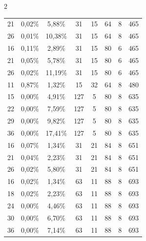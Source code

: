 \begin{multicols}{2}
\begin{center}
{\begin{tabular}{|c|c|c|c|c|c|c|c|}
21&0,02\%&\hphantom{9}5,88\%&31&15&64&8&465\\

26&0,01\%&10,38\%&31&15&64&8&465\\

\hline

16&0,11\%&\hphantom{9}2,89\%&31&15&80&6&465\\

21&0,05\%&\hphantom{9}5,78\%&31&15&80&6&465\\

26&0,02\%&11,19\%&31&15&80&6&465\\

\hline

11&0,87\%&\hphantom{9}1,32\%&15&32&64&8&480\\

\hline

15&0,00\%&\hphantom{9}4,91\%&127\hphantom{9}&\hphantom{9}5&80&8&635\\

22&0,00\%&\hphantom{9}7,59\%&127\hphantom{9}&\hphantom{9}5&80&8&635\\

29&0,00\%&\hphantom{9}9,82\%&127\hphantom{9}&\hphantom{9}5&80&8&635\\

36&0,00\%&17,41\%&127\hphantom{9}&\hphantom{9}5&80&8&635\\

\hline

16&0,07\%&\hphantom{9}1,34\%&31&21&84&8&651\\

21&0,04\%&\hphantom{9}2,23\%&31&21&84&8&651\\

26&0,02\%&\hphantom{9}5,80\%&31&21&84&8&651\\

\hline

16&0,02\%&\hphantom{9}1,34\%&63&11&88&8&693\\

18&0,02\%&\hphantom{9}2,23\%&63&11&88&8&693\\

24&0,00\%&\hphantom{9}4,46\%&63&11&88&8&693\\

30&0,00\%&\hphantom{9}\hphantom{9}6,70\%&63&11&88&8&693\\

36&0,00\%&\hphantom{9}7,14\%&63&11&88&8&693\\


\end{tabular}}
\end{center}
\end{multicols}
